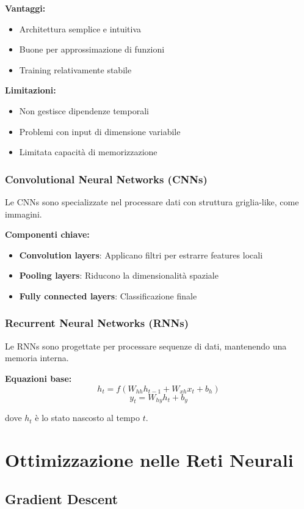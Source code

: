 \documentclass[12pt,a4paper,twoside]{report}
\begin{document}
\textbf{Vantaggi:}
\begin{itemize}
    \item Architettura semplice e intuitiva
    \item Buone per approssimazione di funzioni
    \item Training relativamente stabile
\end{itemize}

\textbf{Limitazioni:}
\begin{itemize}
    \item Non gestisce dipendenze temporali
    \item Problemi con input di dimensione variabile
    \item Limitata capacità di memorizzazione
\end{itemize}

\subsubsection{Convolutional Neural Networks (CNNs)}
Le CNNs sono specializzate nel processare dati con struttura griglia-like, come immagini.

\textbf{Componenti chiave:}
\begin{itemize}
    \item \textbf{Convolution layers}: Applicano filtri per estrarre features locali
    \item \textbf{Pooling layers}: Riducono la dimensionalità spaziale
    \item \textbf{Fully connected layers}: Classificazione finale
\end{itemize}

\subsubsection{Recurrent Neural Networks (RNNs)}
Le RNNs sono progettate per processare sequenze di dati, mantenendo una memoria interna.

\textbf{Equazioni base:}
$$h_t = f(W_{hh} h_{t-1} + W_{xh} x_t + b_h)$$
$$y_t = W_{hy} h_t + b_y$$

dove $h_t$ è lo stato nascosto al tempo $t$.

\section{Ottimizzazione nelle Reti Neurali}

\subsection{Gradient Descent}
\end{document}
